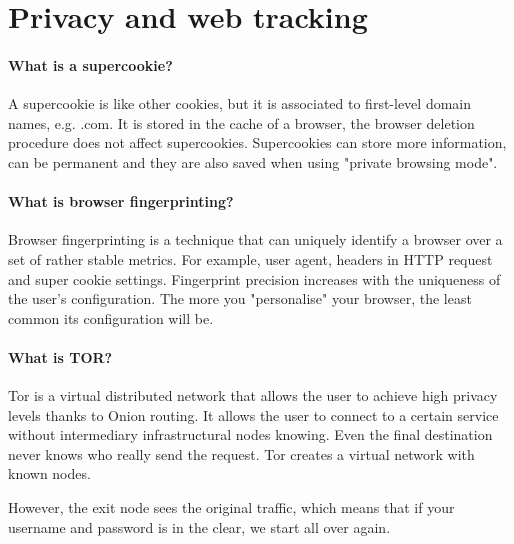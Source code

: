 \section{Privacy and web tracking}
\paragraph{What is a supercookie?}
A supercookie is like other cookies, but it is associated to first-level domain names, e.g. .com. It is stored in the cache of a browser, the browser deletion procedure does not affect supercookies. Supercookies can store more information, can be permanent and they are also saved when using "private browsing mode".

\paragraph{What is browser fingerprinting?}
Browser fingerprinting is a technique that can uniquely identify a browser over a set of rather stable metrics. For example, user agent, headers in HTTP request and super cookie settings. Fingerprint precision increases with the uniqueness of the user's configuration. The more you "personalise" your browser, the least common its configuration will be.

\paragraph{What is TOR?}
Tor is a virtual distributed network that allows the user to achieve high privacy levels thanks to Onion routing. It allows the user to connect to a certain service without intermediary infrastructural nodes knowing. Even the final destination never knows who really send the request. Tor creates a virtual network with known nodes.  

However, the exit node sees the original traffic, which means that if your username and password is in the clear, we start all over again.